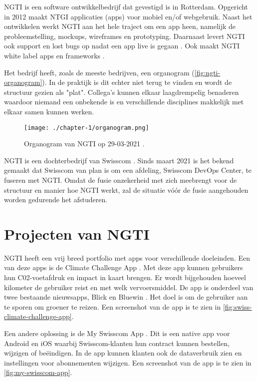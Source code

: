 
NGTI is een software ontwikkelbedrijf dat gevestigd is in Rotterdam. Opgericht in 2012 maakt NTGI applicaties (apps) voor mobiel en/of webgebruik. Naast het ontwikkelen werkt NGTI aan het hele traject om een app heen, namelijk de probleemstelling, mockups, wireframes en prototyping. Daarnaast levert NGTI ook support en lost bugs op nadat een app live is gegaan \cite{ngti-services}. Ook maakt NGTI white label apps en frameworks \cite{ngti-solutions}.

Het bedrijf heeft, zoals de meeste bedrijven, een organogram (\autoref{fig:ngti-organogram}). In de praktijk is dit echter niet terug te vinden en wordt de structuur gezien als "plat". Collega's kunnen elkaar laagdrempelig benaderen waardoor niemand een onbekende is en verschillende disciplines makkelijk met elkaar samen kunnen werken.  

\begin{figure}[hbt!]
  \centering
  \texttt{[image: ./chapter-1/organogram.png]}
  \caption{Organogram van NGTI op 29-03-2021 \cite{ngti-organogram}.}
  \label{fig:ngti-organogram}
\end{figure}

NGTI is een dochterbedrijf van Swisscom \cite{swisscom-other-division}. Sinds maart 2021 is het bekend gemaakt dat Swisscom van plan is om een afdeling, Swisscom DevOps Center, te fuseren met NGTI. Omdat de fusie onzekerheid met zich meebrengt voor de structuur en manier hoe NGTI werkt, zal de situatie vóór de fusie aangehouden worden gedurende het afstuderen.

\section{Projecten van NGTI}\label{sec:ch1-projecten-van-ngti}
NGTI heeft een vrij breed portfolio met apps voor verschillende doeleinden. Een van deze apps is de Climate Challenge App \cite{ngti-swisscom-climate-challenge}. Met deze app kunnen gebruikers hun C02-voetafdruk en impact in kaart brengen. Er wordt bijgehouden hoeveel kilometer de gebruiker reist en met welk vervoersmiddel. De app is onderdeel van twee bestaande nieuwsapps, Blick en Bluewin \cite{swisscom-climate-challenge-integration}. Het doel is om de gebruiker aan te sporen om groener te reizen. Een screenshot van de app is te zien in \autoref{fig:swiss-climate-challenge-app}.

Een andere oplossing is de My Swisscom App \cite{ngti-my-swisscom-app}. Dit is een native app voor Android en iOS waarbij Swisscom-klanten hun contract kunnen bestellen, wijzigen of beëindigen. In de app kunnen klanten ook de dataverbruik zien en instellingen voor abonnementen wijzigen. Een screenshot van de app is te zien in \autoref{fig:my-swisscom-app}.

